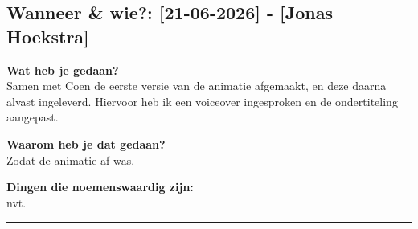 
\subsection*{Wanneer \& wie?: [21-06-2026] - [Jonas Hoekstra]}

\textbf{Wat heb je gedaan?}\\
Samen met Coen de eerste versie van de animatie afgemaakt, en deze daarna alvast ingeleverd. Hiervoor heb ik een voiceover ingesproken en de ondertiteling aangepast.
\vspace{0.3cm} 

\noindent \textbf{Waarom heb je dat gedaan?}\\
Zodat de animatie af was.

\noindent \textbf{Dingen die noemenswaardig zijn:}\\
nvt.


\vspace{0.5cm}
\hrule 
\vspace{0.5cm}
